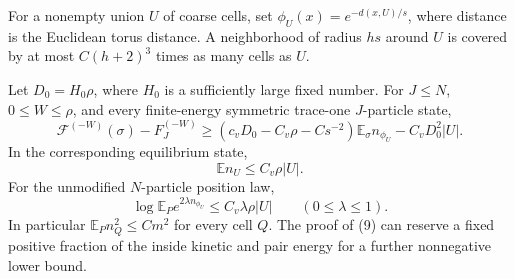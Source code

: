 For a nonempty union $U$ of coarse cells, set
$\phi_U(x)=e^{-d(x,U)/s}$, where distance is the Euclidean torus
distance. A neighborhood of radius $hs$ around $U$ is covered by
at most $C(h+2)^3$ times as many cells as $U$.

\begin{lemma}\label{lem:density-tilts}
Let $D_0=H_0\rho$, where $H_0$ is a sufficiently large fixed number.
For $J\leq N$, $0\leq W\leq\rho$, and every finite-energy
symmetric trace-one $J$-particle state,
\begin{equation}
 \mathcal F^{(-W)}(\sigma)-F_J^{(-W)}
 \geq(c_vD_0-C_v\rho-Cs^{-2})\mathbb E_\sigma n_{\phi_U}
       -C_vD_0^2|U|.\tag{9}\label{eq:9}
\end{equation}
In the corresponding equilibrium state,
\begin{equation}
 \mathbb E n_U\leq C_v\rho|U|.\tag{10}\label{eq:10}
\end{equation}
For the unmodified $N$-particle position law,
\begin{equation}
 \log\mathbb E_Pe^{2\lambda n_{\phi_U}}
 \leq C_v\lambda\rho|U|\qquad(0\leq\lambda\leq1).
 \tag{11}\label{eq:11}
\end{equation}
In particular $\mathbb E_P n_Q^2\leq C m^2$ for every cell $Q$.
The proof of (9) can reserve a fixed positive fraction of the
inside kinetic and pair energy for a further nonnegative lower bound.
\end{lemma}

